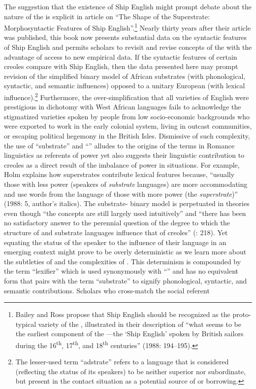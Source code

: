 The suggestion that the existence of Ship English might prompt debate about the nature of the  is explicit in  article on “The Shape of the Superstrate: Morphosyntactic Features of Ship English”.\footnote{Bailey and Ross propose that Ship English should be recognized as the proto-typical variety of the , illustrated in their description of “what seems to be the earliest component of the —the ‘Ship English’ spoken by British sailors during the 16\textsuperscript{th}, 17\textsuperscript{th}, and 18\textsuperscript{th} centuries” (1988: 194–195).}  Nearly thirty years after their article was published, this book now presents substantial data on the syntactic features of Ship English and permits scholars to revisit and revise concepts of the  with the advantage of access to new empirical data. If the syntactic features of certain creoles compare with Ship English, then the data presented here may prompt revision of the simplified binary model of African substrates (with phonological, syntactic, and semantic influences) opposed to a unitary European  (with lexical influence).\footnote{The lesser-used term “adstrate” refers to a language that is considered (reflecting the status of its speakers) to be neither superior nor subordinate, but present in the contact situation as a potential source of  or borrowing.}  Furthermore, the over-simplification that all varieties of English were prestigious in dichotomy with West African languages fails to acknowledge the stigmatized varieties spoken by people from low socio-economic backgrounds who were exported to work in the early colonial system, living in outcast communities, or escaping political hegemony in the British Isles. Dismissive of such complexity, the use of “substrate” and “” alludes to the origins of the terms in Romance linguistics as referents of power yet also suggests their linguistic contribution to creoles as a direct result of the imbalance of power in  situations. For example, Holm explains how superstrates contribute lexical features because, “usually those with less power (speakers of \textit{substrate} languages) are more accommodating and use words from the language of those with more power (the \textit{superstrate})” (1988: 5, author’s italics). The substrate- binary model is perpetuated in  theories even though “the concepts are still largely used intuitively” \citep[55]{Selbach2008} and “there has been no satisfactory answer to the perennial question of the degree to which the structure of  and substrate languages influence that of creoles” (\citealt{Holm2009}: 218). Yet equating the status of the speaker to the influence of their language in an emerging  context might prove to be overly deterministic as we learn more about the subtleties of  and the complexities of . This determinism is compounded by the term “lexifier” which is used synonymously with “” and has no equivalent form that pairs with the term “substrate” to signify phonological, syntactic, and semantic contributions. Scholars who cross-match the social referent 